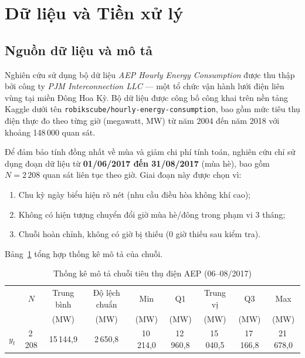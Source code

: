 \documentclass[12pt, a4paper]{article}
\theoremstyle{definition}
\begin{document}
\newpage
\section{Dữ liệu và Tiền xử lý}

\subsection{Nguồn dữ liệu và mô tả}
\label{sec:data}
Nghiên cứu sử dụng bộ dữ liệu \textit{AEP Hourly Energy Consumption} được thu thập
bởi công ty \textit{PJM Interconnection LLC} --- một tổ chức vận hành lưới điện liên
vùng tại miền Đông Hoa Kỳ. Bộ dữ liệu được công bố công khai trên nền tảng Kaggle
dưới tên \texttt{robikscube/hourly-energy-consumption}, bao gồm mức tiêu thụ điện
thực đo theo từng giờ (megawatt, MW) từ năm 2004 đến năm 2018 với khoảng 148\,000
quan sát.

Để đảm bảo tính đồng nhất về mùa và giảm chi phí tính toán, nghiên cứu chỉ sử
dụng đoạn dữ liệu từ \textbf{01/06/2017 đến 31/08/2017} (mùa hè), bao gồm
$N = 2\,208$ quan sát liên tục theo giờ. Giai đoạn này được chọn vì:
\begin{enumerate}[leftmargin=2em]
  \item Chu kỳ ngày biểu hiện rõ nét (nhu cầu điều hòa không khí cao);
  \item Không có hiện tượng chuyển đổi giờ mùa hè/đông trong phạm vi 3 tháng;
  \item Chuỗi hoàn chỉnh, không có giờ bị thiếu (0 giờ thiếu sau kiểm tra).
\end{enumerate}

Bảng~\ref{tab:descriptive} tổng hợp thống kê mô tả của chuỗi.

\begin{table}[H]
  \centering
  \caption{Thống kê mô tả chuỗi tiêu thụ điện AEP (06--08/2017)}
  \label{tab:descriptive}
  \small
  \begin{tabular}{lcccccccc}
    \toprule
    & $N$ & Trung bình & Độ lệch chuẩn & Min & Q1 & Trung vị & Q3 & Max \\
    & & (MW) & (MW) & (MW) & (MW) & (MW) & (MW) & (MW) \\
    \midrule
    $y_t$ & 2\,208 & 15\,144{,}9 & 2\,650{,}8 & 10\,214{,}0
          & 12\,960{,}8 & 15\,040{,}5 & 17\,166{,}8 & 21\,678{,}0 \\
    \bottomrule
  \end{tabular}
\end{table}
\end{document}
